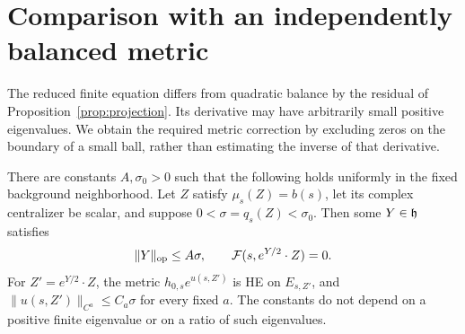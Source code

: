 \section{Comparison with an independently balanced metric}\label{sec:calibration}

The reduced finite equation differs from quadratic balance by the
residual of Proposition~\ref{prop:projection}. Its derivative may have
arbitrarily small positive eigenvalues. We obtain the required metric
correction by excluding zeros on the boundary of a small ball, rather
than estimating the inverse of that derivative.

\begin{theorem}\label{thm:calibration}
There are constants $A,\sigma_0>0$ such that the following holds
uniformly in the fixed background neighborhood. Let $Z$ satisfy
$\mu_s(Z)=b(s)$, let its complex centralizer be scalar, and suppose
$0<\sigma=q_s(Z)<\sigma_0$. Then some $Y\in\mathfrak h$ satisfies
\begin{equation}\label{eq:calibration}
\|Y\|_{\mathrm{op}}\le A\sigma,\qquad
\mathcal F(s,e^{Y/2}\cdot Z)=0.
\end{equation}
For $Z'=e^{Y/2}\cdot Z$, the metric $h_{0,s}e^{u(s,Z')}$ is HE
on $E_{s,Z'}$, and $\|u(s,Z')\|_{C^a}\le C_a\sigma$ for every
fixed $a$. The constants do not depend on a positive finite
eigenvalue or on a ratio of such eigenvalues.
\end{theorem}

